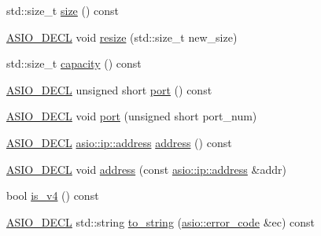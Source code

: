 \begin{DoxyCompactItemize}
\item 
std\+::size\+\_\+t \hyperlink{classasio_1_1ip_1_1detail_1_1endpoint_a6f90770dfdf1ae13e65bf52aa09a87f2}{size} () const 
\item 
\hyperlink{config_8hpp_ab54d01ea04afeb9a8b39cfac467656b7}{A\+S\+I\+O\+\_\+\+D\+E\+C\+L} void \hyperlink{classasio_1_1ip_1_1detail_1_1endpoint_a351151a62463d6f3c5bc3dbbdcb407e5}{resize} (std\+::size\+\_\+t new\+\_\+size)
\item 
std\+::size\+\_\+t \hyperlink{classasio_1_1ip_1_1detail_1_1endpoint_ad7183aad01582f4e7270626b754832f5}{capacity} () const 
\item 
\hyperlink{config_8hpp_ab54d01ea04afeb9a8b39cfac467656b7}{A\+S\+I\+O\+\_\+\+D\+E\+C\+L} unsigned short \hyperlink{classasio_1_1ip_1_1detail_1_1endpoint_ada2c12e4d705041969082ceedec9eeea}{port} () const 
\item 
\hyperlink{config_8hpp_ab54d01ea04afeb9a8b39cfac467656b7}{A\+S\+I\+O\+\_\+\+D\+E\+C\+L} void \hyperlink{classasio_1_1ip_1_1detail_1_1endpoint_ae787dc8af2c02a78cd27493cdfc6ed5a}{port} (unsigned short port\+\_\+num)
\item 
\hyperlink{config_8hpp_ab54d01ea04afeb9a8b39cfac467656b7}{A\+S\+I\+O\+\_\+\+D\+E\+C\+L} \hyperlink{classasio_1_1ip_1_1address}{asio\+::ip\+::address} \hyperlink{classasio_1_1ip_1_1detail_1_1endpoint_a89db3d9a5df0bbda1566a8cefc2865d5}{address} () const 
\item 
\hyperlink{config_8hpp_ab54d01ea04afeb9a8b39cfac467656b7}{A\+S\+I\+O\+\_\+\+D\+E\+C\+L} void \hyperlink{classasio_1_1ip_1_1detail_1_1endpoint_a7adea49885bafcb1c6b5dd2f4aba5ba1}{address} (const \hyperlink{classasio_1_1ip_1_1address}{asio\+::ip\+::address} \&addr)
\item 
bool \hyperlink{classasio_1_1ip_1_1detail_1_1endpoint_a65339043ed862c89a16a528ef6884ac4}{is\+\_\+v4} () const 
\item 
\hyperlink{config_8hpp_ab54d01ea04afeb9a8b39cfac467656b7}{A\+S\+I\+O\+\_\+\+D\+E\+C\+L} std\+::string \hyperlink{classasio_1_1ip_1_1detail_1_1endpoint_a3bea4bcc94c1b85ff0f402a119a496ec}{to\+\_\+string} (\hyperlink{classasio_1_1error__code}{asio\+::error\+\_\+code} \&ec) const 
\end{DoxyCompactItemize}
